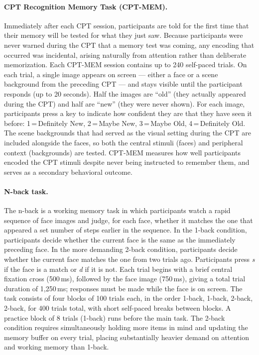 \paragraph{CPT Recognition Memory Task (CPT-MEM).} Immediately after each CPT session, participants are told for the first time that their memory will be tested for what they just saw. Because participants were never warned during the CPT that a memory test was coming, any encoding that occurred was incidental, arising naturally from attention rather than deliberate memorization. Each CPT-MEM session contains up to 240 self-paced trials. On each trial, a single image appears on screen --- either a face or a scene background from the preceding CPT --- and stays visible until the participant responds (up to 20 seconds). Half the images are ``old'' (they actually appeared during the CPT) and half are ``new'' (they were never shown). For each image, participants press a key to indicate how confident they are that they have seen it before: 1\,=\,Definitely New, 2\,=\,Maybe New, 3\,=\,Maybe Old, 4\,=\,Definitely Old. The scene backgrounds that had served as the visual setting during the CPT are included alongside the faces, so both the central stimuli (faces) and peripheral context (backgrounds) are tested. CPT-MEM measures how well participants encoded the CPT stimuli despite never being instructed to remember them, and serves as a secondary behavioral outcome.

\paragraph{N-back task.} The n-back is a working memory task in which participants watch a rapid sequence of face images and judge, for each face, whether it matches the one that appeared a set number of steps earlier in the sequence. In the 1-back condition, participants decide whether the current face is the same as the immediately preceding face. In the more demanding 2-back condition, participants decide whether the current face matches the one from two trials ago. Participants press \textit{s} if the face is a match or \textit{d} if it is not. Each trial begins with a brief central fixation cross (500\,ms), followed by the face image (750\,ms), giving a total trial duration of 1,250\,ms; responses must be made while the face is on screen. The task consists of four blocks of 100 trials each, in the order 1-back, 1-back, 2-back, 2-back, for 400 trials total, with short self-paced breaks between blocks. A practice block of 8 trials (1-back) runs before the main task. The 2-back condition requires simultaneously holding more items in mind and updating the memory buffer on every trial, placing substantially heavier demand on attention and working memory than 1-back.


